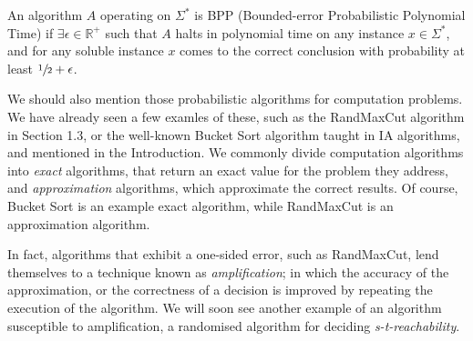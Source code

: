 	\begin{comment}
		(co-)RP algorithms are examples of algorithms with one-sided error. \\
		This means that we can draw the following useful conclusion about certain 
		outcomes of an RP $A$: If $x \notin L$, then the answer will be correct, and 
		contrapositively, if the conclusion of $A$ is ``yes'', then it is also correct.
	\end{comment}
	\begin{definition}
		An algorithm $A$ operating on $\Sigma^*$ is BPP (Bounded-error Probabilistic 
		Polynomial Time) if $\exists \epsilon \in \mathbb{R}^+$ such that $A$ halts in 
		polynomial time on any instance $x \in \Sigma^*$, and for any soluble instance $x
		$ comes to the correct conclusion with probability at least $\sfrac{1}{2} + 
		\epsilon$.
	\end{definition}
	\begin{comment}
		One sometimes sees BPP defined as the class of algorithms that conlcude 
		incorrectly with probability at most $p < \sfrac{1}{2}$, where $p$ is some fixed 
		constant. It should be noted, however, that for any choice of $p$, the generated 
		class of algorithms remains the same. This is why we present the more general 
		form as above.
	\end{comment}

	We should also mention those probabilistic algorithms for computation problems. We have 
	already seen a few examles of these, such as the RandMaxCut algorithm in Section 1.3, or 
	the well-known Bucket Sort algorithm taught in IA algorithms, and mentioned in the 
	Introduction. We commonly divide computation algorithms into \emph{exact} algorithms, 
	that return an exact value for the problem they address, and \emph{approximation} 
	algorithms, which approximate the correct results. Of course, Bucket Sort is an example 
	exact algorithm, while RandMaxCut is an approximation algorithm. \par
	In fact, algorithms that exhibit a one-sided error, such as RandMaxCut, lend themselves 
	to a technique known as \emph{amplification}; in which the accuracy of the approximation, 
	or the correctness of a decision is improved by repeating the execution of the algorithm. 
	We will soon see another example of an algorithm susceptible to amplification, a 
	randomised algorithm for deciding \emph{s-t-reachability}.

